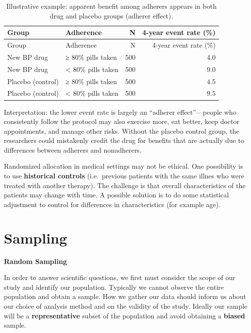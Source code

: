 \documentclass[
  letterpaper,
  DIV=11,
  numbers=noendperiod]{scrreprt}
\begin{document}
\begin{longtable}[]{@{}llrr@{}}
\caption{Illustrative example: apparent benefit among adherers appears
in both drug and placebo groups (adherer effect).}\tabularnewline
\toprule\noalign{}
Group & Adherence & N & 4-year event rate (\%) \\
\midrule\noalign{}
\endfirsthead
\toprule\noalign{}
Group & Adherence & N & 4-year event rate (\%) \\
\midrule\noalign{}
\endhead
\bottomrule\noalign{}
\endlastfoot
New BP drug & ≥ 80\% pills taken & 500 & 4.0 \\
New BP drug & \textless{} 80\% pills taken & 500 & 9.0 \\
Placebo (control) & ≥ 80\% pills taken & 500 & 4.5 \\
Placebo (control) & \textless{} 80\% pills taken & 500 & 9.5 \\
\end{longtable}

Interpretation: the lower event rate is largely an ``adherer
effect''---people who consistently follow the protocol may also exercise
more, eat better, keep doctor appointments, and manage other risks.
Without the placebo control group, the researchers could mistakenly
credit the drug for benefits that are actually due to differences
between adherers and nonadherers.

Randomized allocation in medical settings may not be ethical. One
possibility is to use \textbf{historical controls} (i.e.~previous
patients with the same illnes who were treated with another therapy).
The challenge is that overall characteristics of the patients may change
with time. A possible solution is to do some statistical adjustment to
control for differences in characteristics (for example age).

\section{Sampling}\label{sampling}

\textbf{Random Sampling}

In order to answer scientific questions, we first must consider the
scope of our study and identify our population. Typically we cannot
observe the entire population and obtain a sample. How we gather our
data should inform us about our choice of analysis method and on the
validity of the study. Ideally our sample will be a
\textbf{representative} subset of the population and avoid obtaining a
\textbf{biased} sample.
\end{document}
